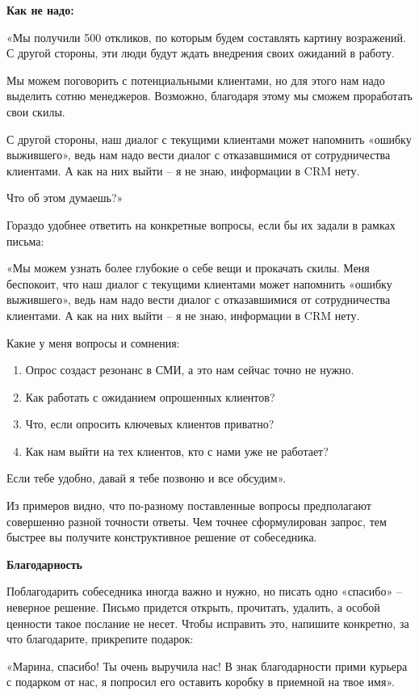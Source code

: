 \textbf{Как не надо: }

«Мы получили 500 откликов, по которым будем составлять картину возражений. С другой стороны, эти люди будут ждать внедрения своих ожиданий в работу.

Мы можем поговорить с потенциальными клиентами, но для этого нам надо выделить сотню менеджеров. Возможно, благодаря этому мы сможем проработать свои скилы.

С другой стороны, наш диалог с текущими клиентами может напомнить «ошибку выжившего», ведь нам надо вести диалог с отказавшимися от сотрудничества клиентами. А как на них выйти – я не знаю, информации в CRM нету.

Что об этом думаешь?»

Гораздо удобнее ответить на конкретные вопросы, если бы их задали в рамках письма:

«Мы можем узнать более глубокие о себе вещи и прокачать скилы. Меня беспокоит, что наш диалог с текущими клиентами может напомнить «ошибку выжившего», ведь нам надо вести диалог с отказавшимися от сотрудничества клиентами. А как на них выйти – я не знаю, информации в CRM нету.

Какие у меня вопросы и сомнения:
\begin{enumerate}
    \item Опрос создаст резонанс в СМИ, а это нам сейчас точно не нужно.
    \item Как работать с ожиданием опрошенных клиентов?
    \item Что, если опросить ключевых клиентов приватно?
    \item Как нам выйти на тех клиентов, кто с нами уже не работает?
\end{enumerate}

Если тебе удобно, давай я тебе позвоню и все обсудим».

Из примеров видно, что по-разному поставленные вопросы предполагают совершенно разной точности ответы. Чем точнее сформулирован запрос, тем быстрее вы получите конструктивное решение от собеседника.

\textbf{Благодарность}

Поблагодарить собеседника иногда важно и нужно, но писать одно «спасибо» – неверное решение. Письмо придется открыть, прочитать, удалить, а особой ценности такое послание не несет. Чтобы исправить это, напишите конкретно, за что благодарите, прикрепите подарок:

«Марина, спасибо! Ты очень выручила нас! В знак благодарности прими курьера с подарком от нас, я попросил его оставить коробку в приемной на твое имя».

